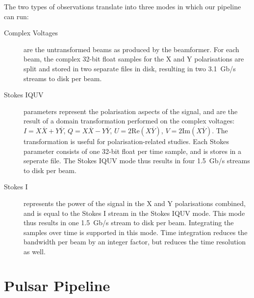 \documentclass{llncs}
\begin{document}
The two types of observations translate into three modes in which our pipeline can run:
\begin{description}
\item[Complex Voltages] are the untransformed beams as produced by the beamformer. For each beam, the complex 32-bit float samples for the X and Y polarisations are split and stored in two separate files in disk, resulting in two 3.1~Gb/s streams to disk per beam.
\item[Stokes IQUV] parameters represent the polarisation aspects of the signal, and are the result of a domain transformation performed on the complex voltages: $I = X\overline{X} + Y\overline{Y}$, $Q = X\overline{X} - Y\overline{Y}$, $U = 2\mathrm{Re}(X\overline{Y})$, $V = 2\mathrm{Im}(X\overline{Y})$. The transformation is useful for polarisation-related studies. Each Stokes parameter consists of one 32-bit float per time sample, and is stores in a seperate file. The Stokes IQUV mode thus results in four 1.5~Gb/s streams to disk per beam. %
\item[Stokes I] represents the power of the signal in the X and Y polarisations combined, and is equal to the Stokes I stream in the Stokes IQUV mode. This mode thus results in one 1.5~Gb/s stream to disk per beam. Integrating the samples over time is supported in this mode. Time integration reduces the bandwidth per beam by an integer factor, but reduces the time resolution as well.
\end{description}



\section{Pulsar Pipeline}

\end{document}
